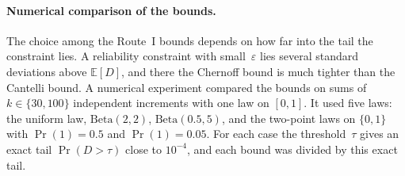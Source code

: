 \documentclass[11pt,a4paper]{article}
\theoremstyle{plain}
\theoremstyle{definition}
\theoremstyle{remark}
\begin{document}
\paragraph{Numerical comparison of the bounds.}
The choice among the Route~I bounds depends on how far into the tail the constraint lies.
A reliability constraint with small~$\varepsilon$ lies several standard deviations above $\mathbb{E}[D]$, and there the Chernoff bound is much tighter than the Cantelli bound.
A numerical experiment compared the bounds on sums of $k \in \{30, 100\}$ independent increments with one law on $[0,1]$.
It used five laws: the uniform law, $\mathrm{Beta}(2,2)$, $\mathrm{Beta}(0.5,5)$, and the two-point laws on $\{0,1\}$ with $\Pr(1) = 0.5$ and $\Pr(1) = 0.05$.
For each case the threshold~$\tau$ gives an exact tail $\Pr(D > \tau)$ close to $10^{-4}$, and each bound was divided by this exact tail.
\end{document}
